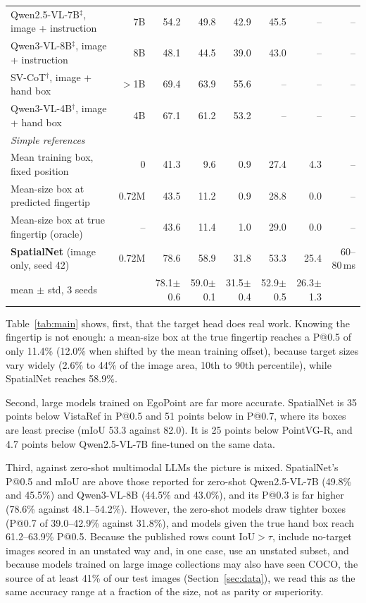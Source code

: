 \begin{table}[t]
\begin{tabular}{lrrrrrrr}
    \quad Qwen2.5-VL-7B$^\ddagger$, image + instruction & 7B & 54.2 & 49.8 & 42.9 & 45.5 & -- & -- \\
    \quad Qwen3-VL-8B$^\ddagger$, image + instruction & 8B & 48.1 & 44.5 & 39.0 & 43.0 & -- & -- \\
    \quad SV-CoT$^\dagger$, image + hand box & $>$1B & 69.4 & 63.9 & 55.6 & -- & -- & -- \\
    \quad Qwen3-VL-4B$^\dagger$, image + hand box & 4B & 67.1 & 61.2 & 53.2 & -- & -- & -- \\
    \multicolumn{8}{l}{\emph{Simple references}} \\
    \quad Mean training box, fixed position & 0 & 41.3 & 9.6 & 0.9 & 27.4 & 4.3 & -- \\
    \quad Mean-size box at predicted fingertip & 0.72M & 43.5 & 11.2 & 0.9 & 28.8 & 0.0 & -- \\
    \quad Mean-size box at true fingertip (oracle) & -- & 43.6 & 11.4 & 1.0 & 29.0 & 0.0 & -- \\
    \midrule
    \textbf{SpatialNet} (image only, seed 42) & 0.72M & 78.6 & 58.9 & 31.8 & 53.3 & 25.4 & 60--80\,ms \\
    \quad mean $\pm$ std, 3 seeds & & 78.1{\scriptsize$\pm$0.6} & 59.0{\scriptsize$\pm$0.1} & 31.5{\scriptsize$\pm$0.4} & 52.9{\scriptsize$\pm$0.5} & 26.3{\scriptsize$\pm$1.3} & \\
    \bottomrule
  \end{tabular}
\end{table}

Table~\ref{tab:main} shows, first, that the target head does real work. Knowing the fingertip is not enough: a mean-size box at the true fingertip reaches a P@0.5 of only 11.4\% (12.0\% when shifted by the mean training offset), because target sizes vary widely (2.6\% to 44\% of the image area, 10th to 90th percentile), while SpatialNet reaches 58.9\%.

Second, large models trained on EgoPoint are far more accurate. SpatialNet is 35 points below VistaRef in P@0.5 and 51 points below in P@0.7, where its boxes are least precise (mIoU 53.3 against 82.0). It is 25 points below PointVG-R, and 4.7 points below Qwen2.5-VL-7B fine-tuned on the same data.

Third, against zero-shot multimodal LLMs the picture is mixed. SpatialNet's P@0.5 and mIoU are above those reported for zero-shot Qwen2.5-VL-7B (49.8\% and 45.5\%) and Qwen3-VL-8B (44.5\% and 43.0\%), and its P@0.3 is far higher (78.6\% against 48.1--54.2\%). However, the zero-shot models draw tighter boxes (P@0.7 of 39.0--42.9\% against 31.8\%), and models given the true hand box reach 61.2--63.9\% P@0.5. Because the published rows count IoU${>}\tau$, include no-target images scored in an unstated way and, in one case, use an unstated subset, and because models trained on large image collections may also have seen COCO, the source of at least 41\% of our test images (Section~\ref{sec:data}), we read this as the same accuracy range at a fraction of the size, not as parity or superiority.

